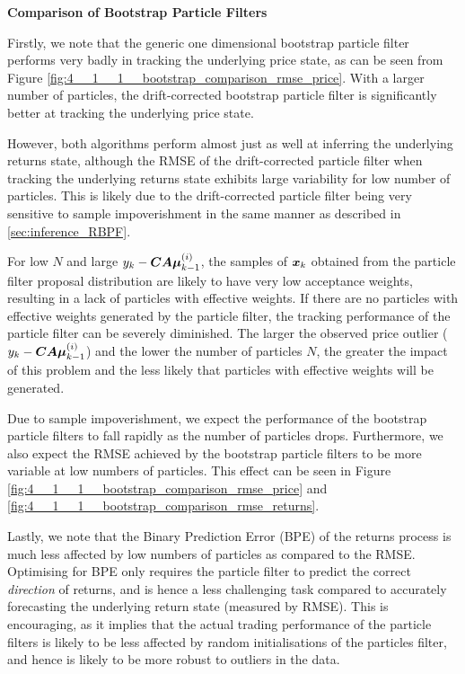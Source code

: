 \documentclass[../main.tex]{subfiles}
\begin{document}
\textbf{Comparison of Bootstrap Particle Filters}

Firstly, we note that the generic one dimensional bootstrap particle filter performs very badly in tracking the underlying price state, as can be seen from Figure \ref{fig:4__1__1__bootstrap_comparison_rmse_price}. With a larger number of particles, the drift-corrected bootstrap particle filter is significantly better at tracking the underlying price state. 

However, both algorithms perform almost just as well at inferring the underlying returns state, although the RMSE of the drift-corrected particle filter when tracking the underlying returns state exhibits large variability for low number of particles. This is likely due to the drift-corrected particle filter being very sensitive to sample impoverishment in the same manner as described in \autoref{sec:inference_RBPF}. 

For low $N$ and large $y_k - \bm{CA\mu}_{k-1}^{(i)}$, the samples of $\bm{x}_k$ obtained from the particle filter proposal distribution are likely to have very low acceptance weights, resulting in a lack of particles with effective weights. If there are no particles with effective weights generated by the particle filter, the tracking performance of the particle filter can be severely diminished. The larger the observed price outlier ($y_k - \bm{CA\mu}_{k-1}^{(i)}$) and the lower the number of particles $N$, the greater the impact of this problem and the less likely that particles with effective weights will be generated.

Due to sample impoverishment, we expect the performance of the bootstrap particle filters to fall rapidly as the number of particles drops. Furthermore, we also expect the RMSE achieved by the bootstrap particle filters to be more variable at low numbers of particles. This effect can be seen in Figure \ref{fig:4__1__1__bootstrap_comparison_rmse_price} and \ref{fig:4__1__1__bootstrap_comparison_rmse_returns}.

Lastly, we note that the Binary Prediction Error (BPE) of the returns process is much less affected by low numbers of particles as compared to the RMSE. Optimising for BPE only requires the particle filter to predict the correct \textit{direction} of returns, and is hence a less challenging task compared to accurately forecasting the underlying return state (measured by RMSE). This is encouraging, as it implies that the actual trading performance of the particle filters is likely to be less affected by random initialisations of the particles filter, and hence is likely to be more robust to outliers in the data. 
\end{document}
